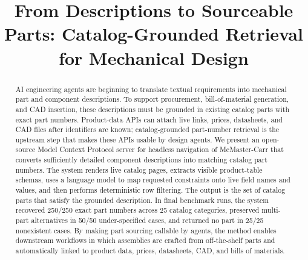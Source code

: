 \documentclass[colorlinks,upint,subscriptcorrection,varvw,hyphenate,balance,nofoot]{asmeconf}
\begin{document}

\title{From Descriptions to Sourceable Parts: Catalog-Grounded Retrieval for Mechanical Design}



\maketitle


\begin{abstract}
AI engineering agents are beginning to translate textual requirements into mechanical part and component descriptions. To support procurement, bill-of-material generation, and CAD insertion, these descriptions must be grounded in existing catalog parts with exact part numbers. Product-data APIs can attach live links, prices, datasheets, and CAD files after identifiers are known; catalog-grounded part-number retrieval is the upstream step that makes these APIs usable by design agents. We present an open-source Model Context Protocol server for headless navigation of McMaster-Carr that converts sufficiently detailed component descriptions into matching catalog part numbers. The system renders live catalog pages, extracts visible product-table schemas, uses a language model to map requested constraints onto live field names and values, and then performs deterministic row filtering. The output is the set of catalog parts that satisfy the grounded description. In final benchmark runs, the system recovered 250/250 exact part numbers across 25 catalog categories, preserved multi-part alternatives in 50/50 under-specified cases, and returned no part in 25/25 nonexistent cases. By making part sourcing callable by agents, the method enables downstream workflows in which assemblies are crafted from off-the-shelf parts and automatically linked to product data, prices, datasheets, CAD, and bills of materials.
\end{abstract}
\end{document}
